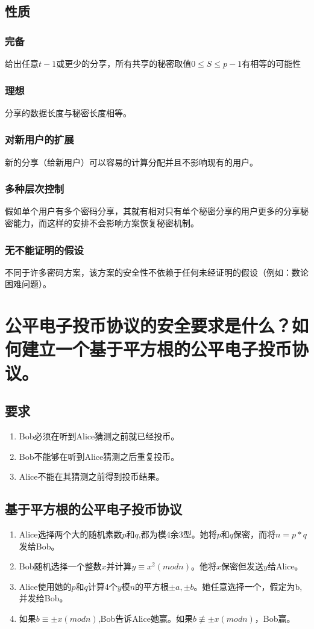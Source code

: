 \documentclass[11pt,a4paper]{article}
\begin{document}
\subsection{性质}
\subsubsection{完备} 给出任意$t-1$或更少的分享，所有共享的秘密取值$0\le S \le p-1$有相等的可能性
\subsubsection{理想}分享的数据长度与秘密长度相等。
\subsubsection{对新用户的扩展}新的分享（给新用户）可以容易的计算分配并且不影响现有的用户。
\subsubsection{多种层次控制}假如单个用户有多个密码分享，其就有相对只有单个秘密分享的用户更多的分享秘密能力，而这样的安排不会影响方案恢复秘密机制。
\subsubsection{无不能证明的假设}不同于许多密码方案，该方案的安全性不依赖于任何未经证明的假设（例如：数论困难问题）。
\section{公平电子投币协议的安全要求是什么？如何建立一个基于平方根的公平电子投币协议。}

\subsection{要求}
\begin{enumerate}[(1)]
\item Bob必须在听到Alice猜测之前就已经投币。
\item Bob不能够在听到Alice猜测之后重复投币。
\item Alice不能在其猜测之前得到投币结果。
\end{enumerate}
\subsection{基于平方根的公平电子投币协议}
\begin{enumerate}
\item Alice选择两个大的随机素数$p$和$q$,都为模4余3型。她将$p$和$q$保密，而将$n=p*q$发给Bob。
\item Bob随机选择一个整数$x$并计算$y \equiv x^2(mod n)$。他将$x$保密但发送$y$给Alice。
\item Alice使用她的$p$和$q$计算4个$y$模$n$的平方根$\pm a,\pm b$。她任意选择一个，假定为b,并发给Bob。
\item 如果$b\equiv \pm x(mod n)$,Bob告诉Alice她赢。如果$b \not\equiv\pm x(mod n)$，Bob赢。
\end{enumerate}
\end{document}
